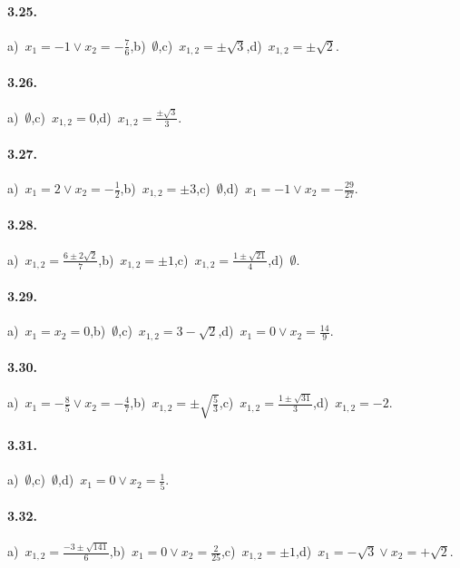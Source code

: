 \paragraph{3.25.} a)~$x_{1} =-1 \vee x_{2} =-\frac{7}{6}$,\quad b)~$\emptyset$,\quad c)~$x_{1,2} = \pm \sqrt{3}$,\quad d)~$x_{1,2} =\pm \sqrt{2}$.

\paragraph{3.26.} a)~$\emptyset$,\quad c)~$x_{1,2}= 0$,\quad d)~$x_{1,2} = \frac{\pm \sqrt{3}}{3}$.

\paragraph{3.27.} a)~$x_{1} = 2 \vee x_{2} =-\frac{1}{2}$,\quad b)~$x_{1,2} =\pm 3$,\quad c)~$\emptyset$,\quad d)~$x_{1} =-1 \vee x_{2} =-\frac{29}{27}$.

\paragraph{3.28.} a)~$x_{1,2} = \frac{6 \pm 2 \sqrt{2}}{7}$,\quad b)~$x_{1,2} =\pm 1$,\quad c)~$x_{1,2} = \frac{1 \pm \sqrt{21}}{4}$,\quad d)~$\emptyset$.

\paragraph{3.29.} a)~$x_{1} = x_{2} = 0$,\quad b)~$\emptyset$,\quad c)~$x_{1,2}= 3-\sqrt{2}$,\quad d)~$x_{1} = 0 \vee x_{2} = \frac{14}{9}$.

\paragraph{3.30.} a)~$x_{1} =-\frac{8}{5} \vee x_{2} =-\frac{4}{7}$,\quad b)~$x_{1,2} = \pm \sqrt{\frac{5}{3}}$,\quad c)~$x_{1,2} = \frac{1 \pm \sqrt{31}}{3}$,\quad d)~$x_{1,2}=-2$.

\paragraph{3.31.} a)~$\emptyset$,\quad c)~$\emptyset$,\quad d)~$x_{1} = 0 \vee x_{2} = \frac{1}{5}$.

\paragraph{3.32.} a)~$x_{1,2} = \frac{- 3 \pm \sqrt{141}}{6}$,\quad b)~$x_{1} = 0 \vee x_{2} = \frac{2}{25}$,\quad c)~$x_{1,2} =\pm 1$,\quad d)~$x_{1} =-\sqrt{3} \vee x_{2} = + \sqrt{2}$.

